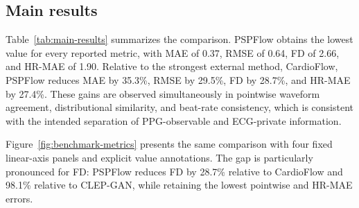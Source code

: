 \subsection{Main results}
\label{sec:main-results}

Table~\ref{tab:main-results} summarizes the comparison. PSPFlow obtains the lowest value for every reported metric, with MAE of 0.37, RMSE of 0.64, FD of 2.66, and HR-MAE of 1.90. Relative to the strongest external method, CardioFlow, PSPFlow reduces MAE by 35.3\%, RMSE by 29.5\%, FD by 28.7\%, and HR-MAE by 27.4\%. These gains are observed simultaneously in pointwise waveform agreement, distributional similarity, and beat-rate consistency, which is consistent with the intended separation of PPG-observable and ECG-private information.

\begin{table}[t]
\centering
\caption{Comparison with PPG-to-ECG baselines on MIMIC-IV. All metrics are lower-is-better. The Ref. column gives the publication venue and year for each baseline.}
\label{tab:main-results}
\setlength{\tabcolsep}{4.5pt}
\small
{}
\end{table}

Figure~\ref{fig:benchmark-metrics} presents the same comparison with four fixed linear-axis panels and explicit value annotations. The gap is particularly pronounced for FD: PSPFlow reduces FD by 28.7\% relative to CardioFlow and 98.1\% relative to CLEP-GAN, while retaining the lowest pointwise and HR-MAE errors.

